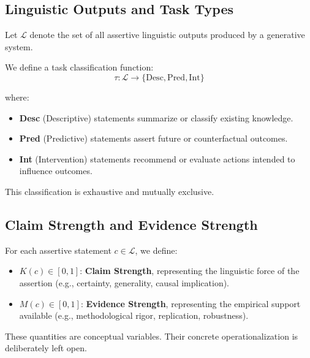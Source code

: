 \subsection{Linguistic Outputs and Task Types}

Let $\mathcal{L}$ denote the set of all assertive linguistic outputs produced by a generative system.

We define a task classification function:
\[
\tau : \mathcal{L} \rightarrow \{ \text{Desc}, \text{Pred}, \text{Int} \}
\]

where:
\begin{itemize}
    \item \textbf{Desc} (Descriptive) statements summarize or classify existing knowledge.
    \item \textbf{Pred} (Predictive) statements assert future or counterfactual outcomes.
    \item \textbf{Int} (Intervention) statements recommend or evaluate actions intended to influence outcomes.
\end{itemize}

This classification is exhaustive and mutually exclusive.


\subsection{Claim Strength and Evidence Strength}

For each assertive statement $c \in \mathcal{L}$, we define:
\begin{itemize}
    \item $K(c) \in [0,1]$: \textbf{Claim Strength}, representing the linguistic force of the assertion (e.g., certainty, generality, causal implication).
    \item $M(c) \in [0,1]$: \textbf{Evidence Strength}, representing the empirical support available (e.g., methodological rigor, replication, robustness).
\end{itemize}

These quantities are conceptual variables. Their concrete operationalization is deliberately left open.


